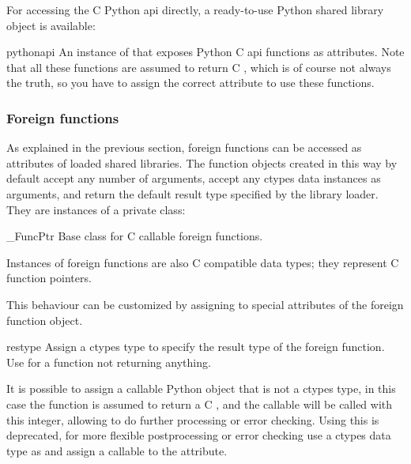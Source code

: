 For accessing the C Python api directly, a ready-to-use Python shared
library object is available:

\begin{datadescni}{pythonapi}
An instance of  that exposes Python C api functions as
attributes.  Note that all these functions are assumed to return C
, which is of course not always the truth, so you have to
assign the correct  attribute to use these functions.
\end{datadescni}


\subsubsection{Foreign functions\label{ctypes-foreign-functions}}

As explained in the previous section, foreign functions can be
accessed as attributes of loaded shared libraries.  The function
objects created in this way by default accept any number of arguments,
accept any ctypes data instances as arguments, and return the default
result type specified by the library loader.  They are instances of a
private class:

\begin{classdesc*}{_FuncPtr}
Base class for C callable foreign functions.
\end{classdesc*}

Instances of foreign functions are also C compatible data types; they
represent C function pointers.

This behaviour can be customized by assigning to special attributes of
the foreign function object.

\begin{memberdesc}{restype}
Assign a ctypes type to specify the result type of the foreign
function.  Use  for  a function not returning
anything.

It is possible to assign a callable Python object that is not a
ctypes type, in this case the function is assumed to return a
C , and the callable will be called with this integer,
allowing to do further processing or error checking.  Using this
is deprecated, for more flexible postprocessing or error checking
use a ctypes data type as  and assign a callable to the
 attribute.
\end{memberdesc}

